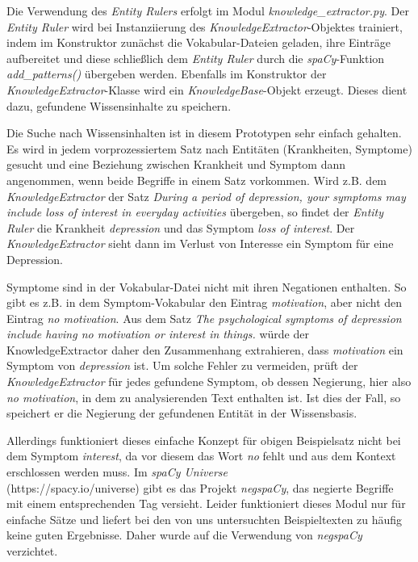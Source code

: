 Die Verwendung des \emph{Entity Rulers} erfolgt im Modul \emph{knowledge\_extractor.py}. Der \emph{Entity Ruler} wird bei Instanziierung des \emph{KnowledgeExtractor}-Objektes trainiert, indem im Konstruktor zunächst die Vokabular-Dateien geladen, ihre Einträge aufbereitet und diese schließlich dem \emph{Entity Ruler} durch die \emph{spaCy}-Funktion \emph{add\_patterns()} übergeben werden. Ebenfalls im Konstruktor der \emph{KnowledgeExtractor}-Klasse wird ein \emph{KnowledgeBase}-Objekt erzeugt. Dieses dient dazu, gefundene Wissensinhalte zu speichern.

Die Suche nach Wissensinhalten ist in diesem Prototypen sehr einfach gehalten. Es wird in jedem vorprozessiertem Satz nach Entitäten (Krankheiten, Symptome) gesucht und eine Beziehung zwischen Krankheit und Symptom dann angenommen, wenn beide Begriffe in einem Satz vorkommen. Wird z.B. dem \emph{KnowledgeExtractor} der Satz \emph{\glqq During a period of depression, your symptoms may include loss of interest in everyday activities\flqq} übergeben, so findet der \emph{Entity Ruler} die Krankheit \emph{depression} und das Symptom \emph{loss of interest}. Der \emph{KnowledgeExtractor} sieht dann im Verlust von Interesse ein Symptom für eine Depression.

Symptome sind in der Vokabular-Datei nicht mit ihren Negationen enthalten. So gibt es z.B. in dem Symptom-Vokabular den Eintrag \emph{motivation}, aber nicht den Eintrag \emph{no motivation}. Aus dem Satz \emph{\glqq The psychological symptoms of depression include having no motivation or interest in things.\flqq} würde der KnowledgeExtractor daher den Zusammenhang extrahieren, dass \emph{motivation} ein Symptom von \emph{depression} ist. Um solche Fehler zu vermeiden, prüft der \emph{KnowledgeExtractor} für jedes gefundene Symptom, ob dessen Negierung, hier also \emph{no motivation}, in dem zu analysierenden Text enthalten ist. Ist dies der Fall, so speichert er die Negierung der gefundenen Entität in der Wissensbasis.

Allerdings funktioniert dieses einfache Konzept für obigen Beispielsatz nicht bei dem Symptom \emph{interest}, da vor diesem das Wort \emph{no} fehlt und aus dem Kontext erschlossen werden muss. Im \emph{spaCy Universe} \\
(https://spacy.io/universe) gibt es das Projekt \emph{negspaCy}, das negierte Begriffe mit einem entsprechenden Tag versieht. Leider funktioniert dieses Modul nur für einfache Sätze und liefert bei den von uns untersuchten Beispieltexten zu häufig keine guten Ergebnisse. Daher wurde auf die Verwendung von \emph{negspaCy} verzichtet.

